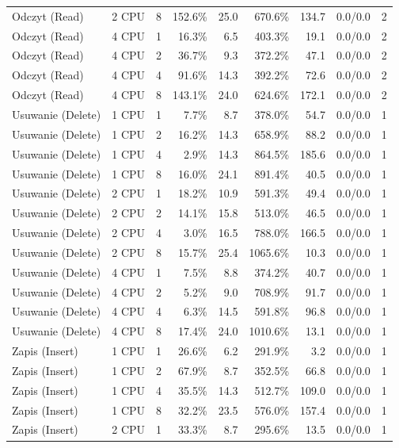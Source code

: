 \begin{table}[ht]
{\begin{tabular}{llcrrrrcc}
Odczyt (Read) & 2 CPU & 8 & 152.6\% & 25.0 & 670.6\% & 134.7 & 0.0/0.0 & 2 \\
Odczyt (Read) & 4 CPU & 1 & 16.3\% & 6.5 & 403.3\% & 19.1 & 0.0/0.0 & 2 \\
Odczyt (Read) & 4 CPU & 2 & 36.7\% & 9.3 & 372.2\% & 47.1 & 0.0/0.0 & 2 \\
Odczyt (Read) & 4 CPU & 4 & 91.6\% & 14.3 & 392.2\% & 72.6 & 0.0/0.0 & 2 \\
Odczyt (Read) & 4 CPU & 8 & 143.1\% & 24.0 & 624.6\% & 172.1 & 0.0/0.0 & 2 \\
Usuwanie (Delete) & 1 CPU & 1 & 7.7\% & 8.7 & 378.0\% & 54.7 & 0.0/0.0 & 1 \\
Usuwanie (Delete) & 1 CPU & 2 & 16.2\% & 14.3 & 658.9\% & 88.2 & 0.0/0.0 & 1 \\
Usuwanie (Delete) & 1 CPU & 4 & 2.9\% & 14.3 & 864.5\% & 185.6 & 0.0/0.0 & 1 \\
Usuwanie (Delete) & 1 CPU & 8 & 16.0\% & 24.1 & 891.4\% & 40.5 & 0.0/0.0 & 1 \\
Usuwanie (Delete) & 2 CPU & 1 & 18.2\% & 10.9 & 591.3\% & 49.4 & 0.0/0.0 & 1 \\
Usuwanie (Delete) & 2 CPU & 2 & 14.1\% & 15.8 & 513.0\% & 46.5 & 0.0/0.0 & 1 \\
Usuwanie (Delete) & 2 CPU & 4 & 3.0\% & 16.5 & 788.0\% & 166.5 & 0.0/0.0 & 1 \\
Usuwanie (Delete) & 2 CPU & 8 & 15.7\% & 25.4 & 1065.6\% & 10.3 & 0.0/0.0 & 1 \\
Usuwanie (Delete) & 4 CPU & 1 & 7.5\% & 8.8 & 374.2\% & 40.7 & 0.0/0.0 & 1 \\
Usuwanie (Delete) & 4 CPU & 2 & 5.2\% & 9.0 & 708.9\% & 91.7 & 0.0/0.0 & 1 \\
Usuwanie (Delete) & 4 CPU & 4 & 6.3\% & 14.5 & 591.8\% & 96.8 & 0.0/0.0 & 1 \\
Usuwanie (Delete) & 4 CPU & 8 & 17.4\% & 24.0 & 1010.6\% & 13.1 & 0.0/0.0 & 1 \\
Zapis (Insert) & 1 CPU & 1 & 26.6\% & 6.2 & 291.9\% & 3.2 & 0.0/0.0 & 1 \\
Zapis (Insert) & 1 CPU & 2 & 67.9\% & 8.7 & 352.5\% & 66.8 & 0.0/0.0 & 1 \\
Zapis (Insert) & 1 CPU & 4 & 35.5\% & 14.3 & 512.7\% & 109.0 & 0.0/0.0 & 1 \\
Zapis (Insert) & 1 CPU & 8 & 32.2\% & 23.5 & 576.0\% & 157.4 & 0.0/0.0 & 1 \\
Zapis (Insert) & 2 CPU & 1 & 33.3\% & 8.7 & 295.6\% & 13.5 & 0.0/0.0 & 1 \\

\end{tabular}}
\end{table}
